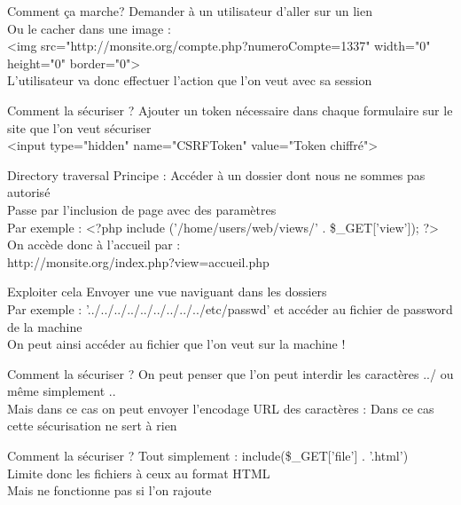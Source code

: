 \documentclass{beamer}
\begin{document}
\begin{frame}{Comment ça marche?}
	Demander à un utilisateur d'aller sur un lien\\
	Ou le cacher dans une image :\\
	<img src="http://monsite.org/compte.php?numeroCompte=1337" width="0" height="0" border="0">\\
	L'utilisateur va donc effectuer l'action que l'on veut avec sa session
\end{frame}

\begin{frame}{Comment la sécuriser ?}
	Ajouter un token nécessaire dans chaque formulaire sur le site que l'on veut sécuriser\\
	<input type="hidden" name="CSRFToken" value="Token chiffré">
\end{frame}

\begin{frame}{Directory traversal}
	Principe : Accéder à un dossier dont nous ne sommes pas autorisé\\
	Passe par l'inclusion de page avec des paramètres\\
	Par exemple : <?php include ('/home/users/web/views/' . \$\_GET['view']); ?>\\
	On accède donc à l'accueil par : \\
	http://monsite.org/index.php?view=accueil.php
\end{frame}

\begin{frame}{Exploiter cela}
	Envoyer une vue naviguant dans les dossiers\\
	Par exemple : '../../../../../../../../../etc/passwd' et accéder au fichier de password de la machine\\
	On peut ainsi accéder au fichier que l'on veut sur la machine !
\end{frame}

\begin{frame}{Comment la sécuriser ?}
	On peut penser que l'on peut interdir les caractères ../ ou même simplement ..\\
	Mais dans ce cas on peut envoyer l'encodage URL des caractères : %
	Dans ce cas cette sécurisation ne sert à rien
\end{frame}

\begin{frame}{Comment la sécuriser ?}
	Tout simplement : include(\$\_GET['file'] . '.html')\\
	Limite donc les fichiers à ceux au format HTML\\
	Mais ne fonctionne pas si l'on rajoute %
\end{frame}
\end{document}
